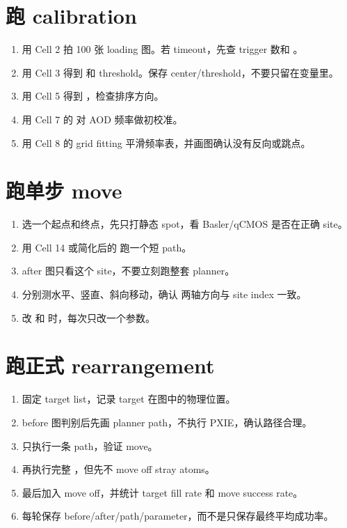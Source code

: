\documentclass[11pt,oneside,openany]{book}
\begin{document}
\section{跑 calibration}
\begin{enumerate}
  \item 用 Cell 2 拍 100 张 loading 图。若 timeout，先查 trigger 数和 。
  \item 用 Cell 3 得到  和 threshold。保存 center/threshold，不要只留在变量里。
  \item 用 Cell 5 得到 ，检查排序方向。
  \item 用 Cell 7 的  对 AOD 频率做初校准。
  \item 用 Cell 8 的 grid fitting 平滑频率表，并画图确认没有反向或跳点。
\end{enumerate}

\section{跑单步 move}
\begin{enumerate}
  \item 选一个起点和终点，先只打静态 spot，看 Basler/qCMOS 是否在正确 site。
  \item 用 Cell 14 或简化后的  跑一个短 path。
  \item after 图只看这个 site，不要立刻跑整套 planner。
  \item 分别测水平、竖直、斜向移动，确认  两轴方向与 site index 一致。
  \item 改  和  时，每次只改一个参数。
\end{enumerate}

\section{跑正式 rearrangement}
\begin{enumerate}
  \item 固定 target list，记录 target 在图中的物理位置。
  \item before 图判别后先画 planner path，不执行 PXIE，确认路径合理。
  \item 只执行一条 path，验证 move。
  \item 再执行完整 ，但先不 move off stray atoms。
  \item 最后加入 move off，并统计 target fill rate 和 move success rate。
  \item 每轮保存 before/after/path/parameter，而不是只保存最终平均成功率。
\end{enumerate}
\end{document}
